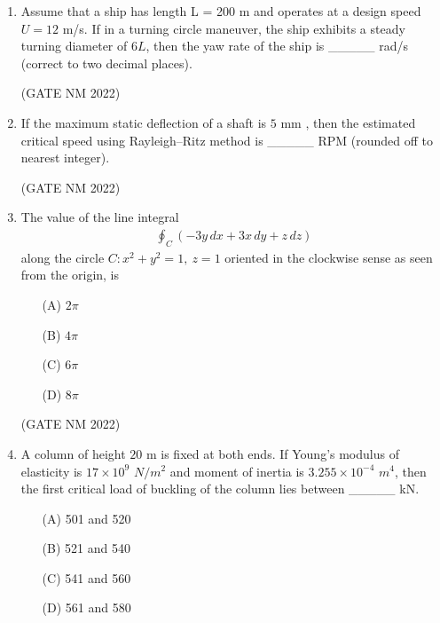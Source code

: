 \documentclass[journal,12pt,onecolumn]{IEEEtran}
\theoremstyle{remark}
\begin{document}
\begin{enumerate}
\item  Assume that a ship has length L = 200 m  and operates at a design speed $U = 12$ m/s.  
If in a turning circle maneuver, the ship exhibits a steady turning diameter of $6L$, then the yaw rate of the ship is \_\_\_\_\_ rad/s (correct to two decimal places).

\hfill(GATE NM 2022)









\item  If the maximum static deflection of a shaft is $5$ mm , then the estimated critical speed using Rayleigh--Ritz method is \_\_\_\_\_ RPM  (rounded off to nearest integer).

	\hfill(GATE NM 2022)


\item  The value of the line integral  
\begin{align*}
\oint_C \!\left( -3y \, dx + 3x \, dy + z \, dz \right)
\end{align*}
along the circle $C: x^2 + y^2 = 1, \ z = 1$ oriented in the clockwise sense as seen from the origin, is

\begin{enumerate}
    \item[(A)] $2\pi$
    \item[(B)] $4\pi$
    \item[(C)] $6\pi$
    \item[(D)] $8\pi$
\end{enumerate}

\hfill(GATE NM 2022)







\item  A column of height $20$ m  is fixed at both ends.  
If Young's modulus of elasticity is $17 \times 10^{9}$ $ N/m^2 $ and moment of inertia is $3.255 \times  10^{-4}$ $ m^4 $, then the first critical load of buckling of the column lies between \_\_\_\_\_ kN.

\begin{enumerate}
    \item[(A)] 501 and 520
    \item[(B)] 521 and 540
    \item[(C)] 541 and 560
    \item[(D)] 561 and 580
\end{enumerate}


\end{enumerate}
\end{document}
